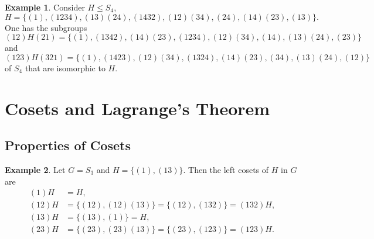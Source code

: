 \documentclass{article}
\theoremstyle{definition}
\newtheorem{definition}{Definition}[section]
\newtheorem{example}{Example}[section]
\begin{document}
 \begin{example}
     Consider $H \leq S_4$,
     \begin{equation*}
         H = \{(1),(1234),(13)(24),(1432),(12)(34),(24),(14)(23),(13)\}.
     \end{equation*}
     One has the subgroups
     \begin{equation*}
         (12)H(21) = \{(1),(1342),(14)(23),(1234),(12)(34),(14),(13)(24),(23)\}
     \end{equation*}
     and
     \begin{equation*}
         (123)H(321) = \{(1),(1423),(12)(34),(1324),(14)(23),(34),(13)(24),(12)\}
     \end{equation*}
     of $S_4$ that are isomorphic to $H$.
 \end{example}
 
  \section{Cosets and Lagrange's Theorem}
 \subsection{Properties of Cosets}
 
 \begin{example}
     Let $G=S_3$ and $H=\{(1),(13)\}$. Then the left cosets of $H$ in $G$ are
     \begin{align*}
         (1)H &= H, \\
         (12)H &= \{(12),(12)(13)\} = \{(12),(132)\} = (132)H, \\
         (13)H &= \{(13),(1)\} = H, \\
         (23)H &= \{(23),(23)(13)\} = \{(23),(123)\} = (123)H.
     \end{align*}
  \end{example}
\end{document}
